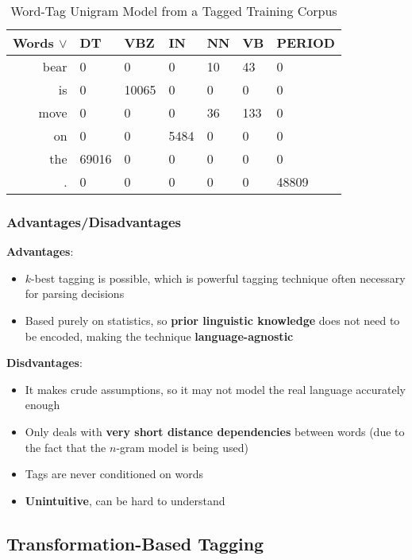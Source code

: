 \documentclass{article}
\begin{document}
\begin{table}
	\centering
	\begin{tabular}{r|llllll}
		\textbf{Words $\lor$} & DT & VBZ & IN & NN & VB & PERIOD \\
		\hline
		bear & 0 & 0 & 0 & 10 & 43 & 0 \\
		is & 0 & 10065 & 0 & 0 & 0 & 0 \\
		move & 0 & 0 & 0 & 36 & 133 & 0 \\
		on & 0 & 0 & 5484 & 0 & 0 & 0 \\
		the & 69016 & 0 & 0 & 0 & 0 & 0 \\
		. & 0 & 0 & 0 & 0 & 0 & 48809 \\
	\end{tabular}
	\caption{Word-Tag Unigram Model from a Tagged Training Corpus}
	\label{tab:word-tag-unigram-model}
\end{table}

\subsubsection{Advantages/Disadvantages}

\textbf{Advantages}:
\begin{itemize}
	\item $k$-best tagging is possible, which is powerful tagging technique often necessary for parsing decisions
	\item Based purely on statistics, so \textbf{prior linguistic knowledge} does not need to be encoded, making the technique \textbf{language-agnostic}
\end{itemize}

\textbf{Disdvantages}:
\begin{itemize}
	\item It makes crude assumptions, so it may not model the real language accurately enough
	\item Only deals with \textbf{very short distance dependencies} between words (due to the fact that the $n$-gram model is being used)
	\item Tags are never conditioned on words 
	\item \textbf{Unintuitive}, can be hard to understand
\end{itemize}

\subsection{Transformation-Based Tagging}
\end{document}
